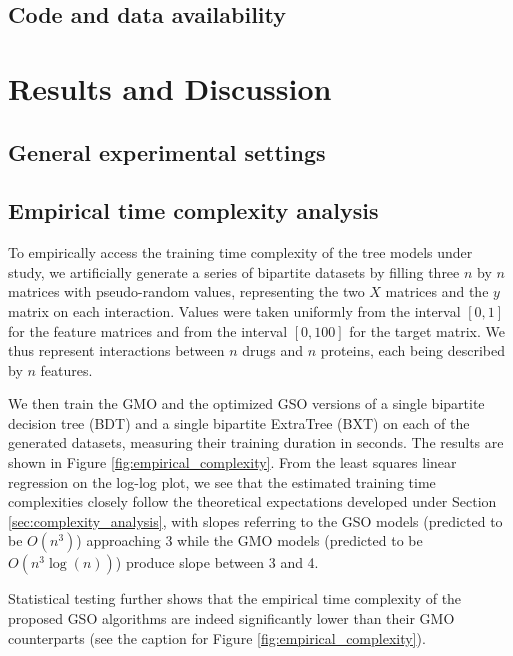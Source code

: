 \subsection{Code and data availability}

\section{Results and Discussion}

\subsection{General experimental settings}


\subsection{Empirical time complexity analysis}
\label{sec:empirical_complexity}

To empirically access the training time complexity of the tree models under study, we artificially generate a series of bipartite datasets by filling three $n$ by $n$ matrices with pseudo-random values, representing the two $X$ matrices and the $y$ matrix on each interaction. Values were taken uniformly from the interval $[0, 1]$ for the feature matrices and from the interval $[0, 100]$ for the target matrix. We thus represent interactions between $n$ drugs and $n$ proteins, each being described by $n$ features.

We then train the GMO and the optimized GSO versions of a single bipartite decision tree (BDT) and a single bipartite ExtraTree (BXT) on each of the generated datasets, measuring their training duration in seconds. The results are shown in Figure \ref{fig:empirical_complexity}. From the least squares linear regression on the log-log plot, we see that the estimated training time complexities closely follow the theoretical expectations developed under Section \ref{sec:complexity_analysis}, with slopes referring to the GSO models (predicted to be $O(n^3)$) approaching 3 while the GMO models (predicted to be $O(n^3\log(n))$) produce slope between 3 and 4.

Statistical testing further shows that the empirical time complexity of the proposed GSO algorithms are indeed significantly lower than their GMO counterparts (see the caption for Figure \ref{fig:empirical_complexity}).


